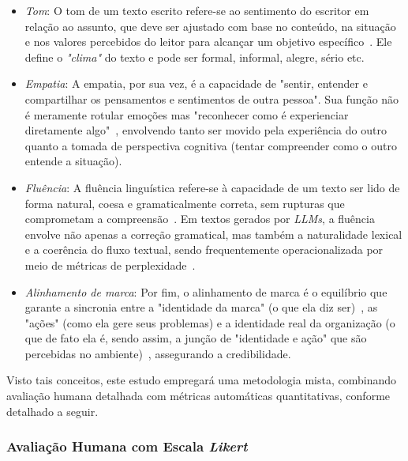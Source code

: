 \documentclass[12pt, a4paper]{article}
\numberwithin{equation}{section}
\begin{document}
\begin{itemize}
\item\textit{{Tom}}: O tom de um texto escrito refere-se ao sentimento do escritor em relação ao assunto, que deve ser ajustado com base no conteúdo, na situação e nos valores percebidos do leitor para alcançar um objetivo específico~\cite{vasquez2013differences}. Ele define o \textit{"clima"} do texto e pode ser formal, informal, alegre, sério etc.

\item\textit{{Empatia}}: A empatia, por sua vez, é a capacidade de "sentir, entender e compartilhar os pensamentos e sentimentos de outra pessoa". Sua função não é meramente rotular emoções mas "reconhecer como é experienciar diretamente algo"~\cite{halpern2003What}, envolvendo tanto ser movido pela experiência do outro~\cite{halpern2003What} quanto a tomada de perspectiva cognitiva (tentar compreender como o outro entende a situação).

\item\textit{{Fluência}}: A fluência linguística refere-se à capacidade de um texto ser lido de forma natural, coesa e gramaticalmente correta, sem rupturas que comprometam a compreensão~\cite{celikyilmaz2021Evaluation}. Em textos gerados por \textit{LLMs}, a fluência envolve não apenas a correção gramatical, mas também a naturalidade lexical e a coerência do fluxo textual, sendo frequentemente operacionalizada por meio de métricas de perplexidade~\cite{liang2023}.

\item\textit{{Alinhamento de marca}}: Por fim, o alinhamento de marca é o equilíbrio que garante a sincronia entre a "identidade da marca" (o que ela diz ser)~\cite{Balmer2012Strategic}, as "ações" (como ela gere seus problemas) e a identidade real da organização (o que de fato ela é, sendo assim, a junção de "identidade e ação" que são percebidas no ambiente)~\cite{Balmer2012Strategic}, assegurando a credibilidade.

\end{itemize}

Visto tais conceitos, este estudo empregará uma metodologia mista, combinando avaliação humana detalhada com métricas automáticas quantitativas, conforme detalhado a seguir.

\subsubsection{Avaliação Humana com Escala \textit{Likert}}
\end{document}
